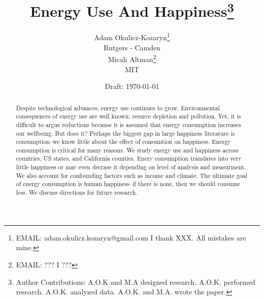 \documentclass[10pt, letterpaper]{article}
\date{Draft: {}\today}
\title{
Energy Use And Happiness\footnote{Author Contributions: A.O.K and M.A designed
  research. A.O.K. performed research. A.O.K. analyzed data. A.O.K. and
  M.A. wrote the paper.  %
}
}
\author{
Adam Okulicz-Kozaryn\thanks{EMAIL: adam.okulicz.kozaryn@gmail.com
  \hfill I thank XXX.  All mistakes are mine.} \\
{\small Rutgers - Camden}\\
Micah Altman\thanks{EMAIL: ???
  \hfill I ???} \\
{\small MIT}
}
\begin{document}


\maketitle
\vspace{-.4in}
\begin{center}

\end{center}

\begin{abstract}
\noindent Despite technological advances, energy use continues to
grow. Environmental consequences of energy use are well known: resurce depletion
and pollution. Yet, it is difficult to argue reductions because it is assumed
that energy consumption increases our wellbeing. But does it?
 Perhaps the biggest gap in large happiness literature is
consumption--we know little about the effect of consumtion on happiness. Energy
consumption is critical for many reasons.  We study energy use and happiness
across countries, US states, and California counties. Enery consumption
translates into very little happiness or may even decrase it depending on level
of analysis and  measurment. We also account for  confounding factors  such as
income and climate. 
 The ultimate goal of energy consumption is human
 happiness--if there is none, then we should consume less. We discuss directions for future research.
\end{abstract}
\end{document}
